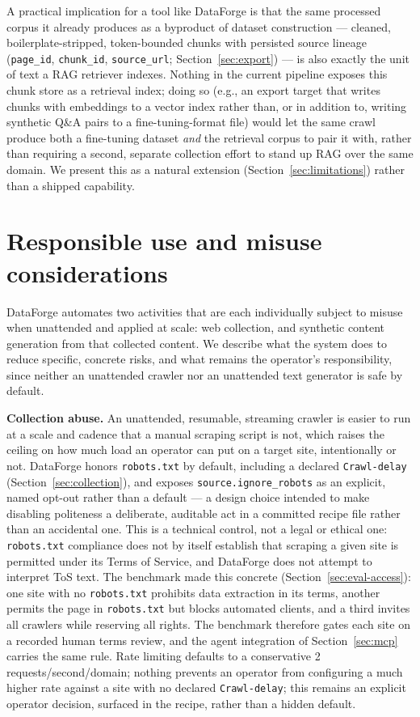 \documentclass[11pt]{article}
\begin{document}
A practical implication for a tool like DataForge is that the same
processed corpus it already produces as a byproduct of dataset
construction --- cleaned, boilerplate-stripped, token-bounded chunks with
persisted source lineage (\texttt{page\_id}, \texttt{chunk\_id},
\texttt{source\_url}; Section~\ref{sec:export}) --- is also exactly the unit of text a
RAG retriever indexes. Nothing in the current pipeline exposes this
chunk store as a retrieval index; doing so (e.g., an export target that
writes chunks with embeddings to a vector index rather than, or in
addition to, writing synthetic Q\&A pairs to a fine-tuning-format file)
would let the same crawl produce both a fine-tuning dataset \emph{and}
the retrieval corpus to pair it with, rather than requiring a second,
separate collection effort to stand up RAG over the same domain. We
present this as a natural extension (Section~\ref{sec:limitations})
rather than a shipped capability.

\section{Responsible use and misuse considerations}
\label{sec:responsible}
\label{sec:misuse}

DataForge automates two activities that are each individually subject to
misuse when unattended and applied at scale: web collection, and
synthetic content generation from that collected content. We describe
what the system does to reduce specific, concrete risks, and what remains
the operator's responsibility, since neither an unattended crawler nor an
unattended text generator is safe by default.

\textbf{Collection abuse.} An unattended, resumable, streaming crawler is
easier to run at a scale and cadence that a manual scraping script is
not, which raises the ceiling on how much load an operator can put on a
target site, intentionally or not. DataForge honors \texttt{robots.txt}
by default, including a declared \texttt{Crawl-delay}
(Section~\ref{sec:collection}), and exposes \texttt{source.ignore\_robots} as an explicit,
named opt-out rather than a default — a design choice intended to make
disabling politeness a deliberate, auditable act in a committed recipe
file rather than an accidental one. This is a technical control, not a
legal or ethical one: \texttt{robots.txt} compliance does not by itself
establish that scraping a given site is permitted under its Terms of
Service, and DataForge does not attempt to interpret ToS text. The
benchmark made this concrete (Section~\ref{sec:eval-access}): one site
with no \texttt{robots.txt} prohibits data extraction in its terms,
another permits the page in \texttt{robots.txt} but blocks automated
clients, and a third invites all crawlers while reserving all rights. The
benchmark therefore gates each site on a recorded human terms review, and
the agent integration of Section~\ref{sec:mcp} carries the same rule. Rate
limiting defaults to a conservative 2 requests/second/domain; nothing
prevents an operator from configuring a much higher rate against a site
with no declared \texttt{Crawl-delay}; this remains an explicit
operator decision, surfaced in the recipe, rather than a hidden default.
\end{document}
